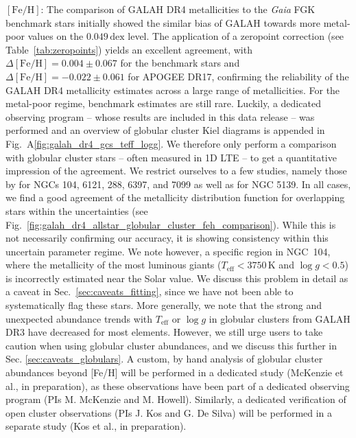 \documentclass[
  journal=pasa,
  manuscript=research-paper, %
  year=2024,
  volume=37
]{cup-journal}
\newcommand{\Teff}{$T_\mathrm{eff}$\xspace}
\newcommand{\logg}{$\log g$\xspace}
\newcommand{\feh}{$\mathrm{[Fe/H]}$\xspace}
\newcommand{\Gaia}{\textit{Gaia}\xspace}
\begin{document}
\feh: The comparison of GALAH DR4 metallicities to the \Gaia FGK benchmark stars initially showed the similar bias of GALAH towards more metal-poor values on the $0.049\,\mathrm{dex}$ level. The application of a zeropoint correction (see Table~\ref{tab:zeropoints}) yields an excellent agreement, with $\Delta \mathrm{[Fe/H]} = 0.004 \pm 0.067$ for the benchmark stars and $\Delta \mathrm{[Fe/H]} = -0.022 \pm 0.061$ for APOGEE DR17, confirming the reliability of the GALAH DR4 metallicity estimates across a large range of metallicities. For the metal-poor regime, benchmark estimates are still rare. Luckily, a dedicated observing program -- whose results are included in this data release -- was performed and an overview of globular cluster Kiel diagrams is appended in Fig.~A\ref{fig:galah_dr4_gcs_teff_logg}. We therefore only perform a comparison with globular cluster stars -- often measured in 1D LTE -- to get a quantitative impression of the agreement. We restrict ourselves to a few studies, namely those by \citet{ Carretta2009c, Carretta2009} for NGCs 104, 6121, 288, 6397, and 7099 as well as \citet{Johnson2010} for NGC 5139. In all cases, we find a good agreement of the metallicity distribution function for overlapping stars within the uncertainties (see Fig.~\ref{fig:galah_dr4_allstar_globular_cluster_feh_comparison}). While this is not necessarily confirming our accuracy, it is showing consistency within this uncertain parameter regime. We note however, a specific region in NGC~104, where the metallicity of the most luminous giants ($T_\mathrm{eff} < 3750\,\mathrm{K}$ and $\log g < 0.5$) is incorrectly estimated near the Solar value. We discuss this problem in detail as a caveat in Sec.~\ref{sec:caveats_fitting}, since we have not been able to systematically flag these stars. More generally, we note that the strong and unexpected abundance trends with \Teff or \logg in globular clusters from GALAH DR3 have decreased for most elements. However, we still urge users to take caution when using globular cluster abundances, and we discuss this further in Sec. \ref{sec:caveats_globulars}. A custom, by hand analysis of globular cluster abundances beyond [Fe/H] will be performed in a dedicated study (McKenzie et al., in preparation), as these observations have been part of a dedicated observing program (PIs M. McKenzie and M. Howell). Similarly, a dedicated verification of open cluster observations (PIs J. Kos and G. De Silva) will be performed in a separate study (Kos et al., in preparation).
\end{document}
